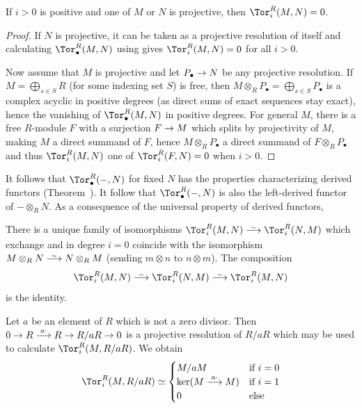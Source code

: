 \documentclass[a4paper,parskip=half,numbers=enddot, DIV=12]{scrreprt}
\begin{document}
\begin{fact}
	If $i>0$ is positive and one of $M$ or $N$ is projective, then $\Tor_i^R(M,N)=0$.
\end{fact}
\begin{proof}
	If $N$ is projective, it can be taken as a projective resolution of itself and calculating $\Tor_\bullet^R(M,N)$ using  gives $\Tor_i^R(M,N)=0$ for all $i>0$. 
	
	Now assume that $M$ is projective and let $P_\bullet \morphism N$ be any projective resolution. If $M=\bigoplus_{s\in S}R$ (for some indexing set $S$) is free, then $M\otimes_RP_\bullet=\bigoplus_{s\in S}P_\bullet$ is a complex acyclic in positive degrees (as direct sums of exact sequences stay exact), hence the vanishing of $\Tor_\bullet^R(M,N)$ in positive degrees. For general $M$, there is a free $R$-module $F$ with a surjection $F\morphism M$ which splits by projectivity of $M$, making $M$ a direct summand of $F$, hence $M\otimes_RP_\bullet$ a direct summand of $F\otimes_RP_\bullet$ and thus $\Tor_i^R(M,N)$ one of $\Tor_i^R(F,N)=0$ when $i>0$. 
\end{proof}
It follows that $\Tor_\bullet^R(-,N)$ for fixed $N$ has the properties characterizing derived functors (Theorem~). It follow that $\Tor_\bullet^R(-,N)$ is also the left-derived functor of $-\otimes_RN$. As a consequence of the universal property of derived functors,
\begin{prop}
	There is a unique family of isomorphisms $\Tor_i^R(M,N)\isomorphism\Tor_i^R(N,M)$ which exchange  and  in degree $i=0$ coincide with the isomorphism $M\otimes_RN\isomorphism N\otimes_RM$ (sending $m\otimes n$ to $n\otimes m$). The composition
	\begin{align*}
		\Tor_i^R(M,N)\isomorphism \Tor_i^R(N,M)\isomorphism\Tor_i^R(M,N)
	\end{align*}
	is the identity.
\end{prop}
\begin{example}
	Let $a$ be an element of $R$ which is not a zero divisor. Then $0\morphism R\morphism[a\cdot ]R\morphism R/aR\morphism 0$ is a projective resolution of $R/aR$ which may be used to calculate $\Tor_i^R(M,R/aR)$. We obtain
	\begin{align*}
		\Tor_i^R(M,R/aR)\simeq\begin{cases}
			M/aM & \text{if }i=0\\
			\ker(M\morphism[a\cdot ]M) & \text{if }i=1\\
			0 & \text{else}
		\end{cases}
	\end{align*}
\end{example}
\end{document}
